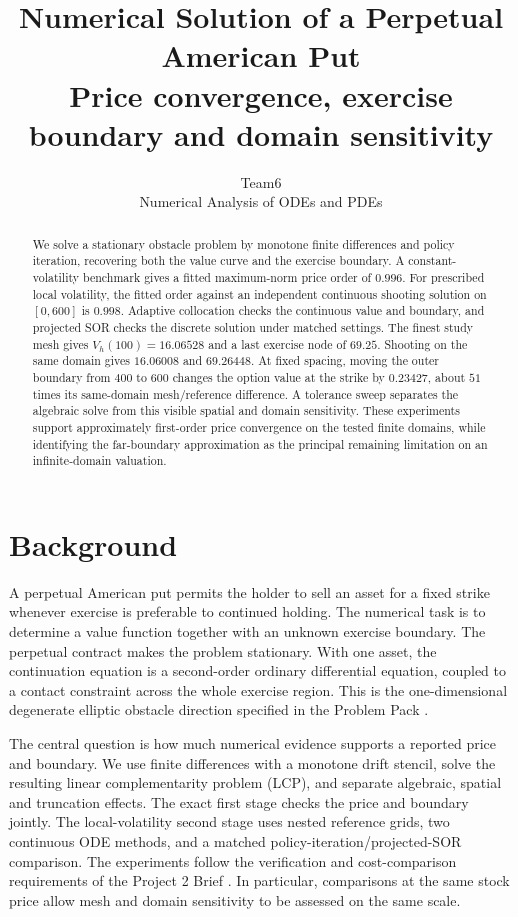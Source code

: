 \documentclass[11pt,a4paper]{article}
\title{\color{ink}\bfseries Numerical Solution of a Perpetual American Put\\[4pt]\large Price convergence, exercise boundary and domain sensitivity}
\author{Team6\\[3pt]\small Numerical Analysis of ODEs and PDEs}
\date{}
\numberwithin{equation}{section}
\begin{document}
\maketitle

\begin{abstract}
We solve a stationary obstacle problem by monotone finite differences and
policy iteration, recovering both the value curve and the exercise boundary.
A constant-volatility benchmark gives a fitted maximum-norm price order of
$0.996$. For prescribed local volatility, the fitted order against an
independent continuous shooting solution on $[0,600]$ is $0.998$.
Adaptive collocation checks the continuous value and boundary, and projected
SOR checks the discrete solution under matched settings. The finest study
mesh gives $V_h(100)=16.06528$ and a last exercise node of $69.25$.
Shooting on the same domain gives $16.06008$ and $69.26448$.
At fixed spacing, moving the outer boundary from $400$ to $600$ changes the
option value at the strike by $0.23427$, about $51$ times its same-domain mesh/reference
difference. A tolerance sweep separates the algebraic solve from this
visible spatial and domain sensitivity. These experiments support
approximately first-order price convergence on the tested finite domains,
while identifying the far-boundary approximation as the principal remaining
limitation on an infinite-domain valuation.
\end{abstract}

\section{Background}\label{sec:background}
A perpetual American put permits the holder to sell an asset for a fixed
strike whenever exercise is preferable to continued holding. The numerical
task is to determine a value function together with an unknown exercise
boundary. The perpetual contract makes the problem stationary. With one
asset, the continuation equation is a second-order ordinary differential
equation, coupled to a contact constraint across the whole exercise region.
This is the one-dimensional degenerate elliptic obstacle direction specified
in the Problem Pack \cite{problemPack}.

The central question is how much numerical evidence supports a reported
price and boundary. We use finite differences with a monotone drift
stencil, solve the resulting linear complementarity problem (LCP), and
separate algebraic, spatial and truncation effects. The exact first stage
checks the price and boundary jointly. The local-volatility second stage
uses nested reference grids, two continuous ODE methods, and a matched
policy-iteration/projected-SOR comparison. The experiments follow the
verification and cost-comparison requirements of the Project 2 Brief
\cite{projectBrief}. In particular, comparisons at the same stock price
allow mesh and domain sensitivity to be assessed on the same scale.
\end{document}

